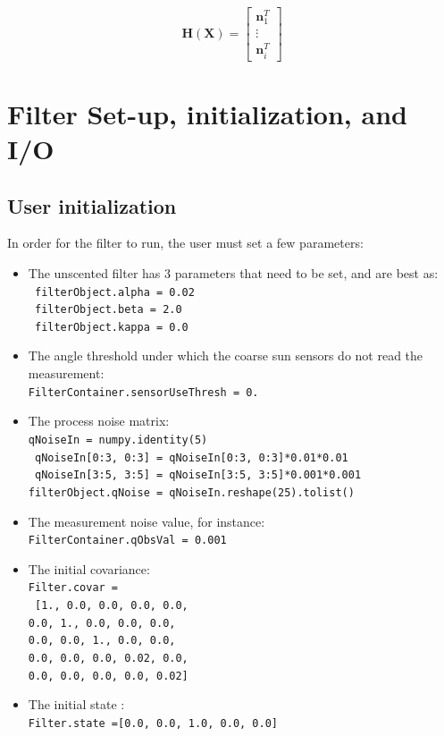 \documentclass[]{BasiliskReportMemo}
\begin{document}
\begin{equation}\label{eq:Hmat}
\bm H(\bm X) = \begin{bmatrix} \bm n_1^T \\ \vdots \\ \bm n_i^T \end{bmatrix} 
\end{equation}


\section{Filter Set-up, initialization, and I/O}

\subsection{User initialization}

In order for the filter to run, the user must set a few parameters:

\begin{itemize}
\item The unscented filter has 3 parameters that need to be set, and are best as: \\
      \texttt{ filterObject.alpha = 0.02} \\
      \texttt{ filterObject.beta = 2.0} \\
      \texttt{ filterObject.kappa = 0.0} 
\item The angle threshold under which the coarse sun sensors do not read the measurement: \\ 
\texttt{FilterContainer.sensorUseThresh = 0.}
\item The process noise matrix: \\
   \texttt{qNoiseIn = numpy.identity(5)} \\
   \texttt{ qNoiseIn[0:3, 0:3] = qNoiseIn[0:3, 0:3]*0.01*0.01} \\
   \texttt{ qNoiseIn[3:5, 3:5] = qNoiseIn[3:5, 3:5]*0.001*0.001} \\
    \texttt{filterObject.qNoise = qNoiseIn.reshape(25).tolist()}
\item The measurement noise value, for instance: \\
 \texttt{FilterContainer.qObsVal = 0.001}
\item The initial covariance: \\
 \texttt{Filter.covar =} \\
  \texttt{ [1., 0.0, 0.0, 0.0, 0.0, \\
                          0.0, 1., 0.0, 0.0, 0.0,\\
                          0.0, 0.0, 1., 0.0, 0.0,\\
                          0.0, 0.0, 0.0, 0.02, 0.0,\\
                          0.0, 0.0, 0.0, 0.0, 0.02]}
 \item The initial state :\\
 \texttt{Filter.state =[0.0, 0.0, 1.0, 0.0, 0.0]}
\end{itemize}
\end{document}
